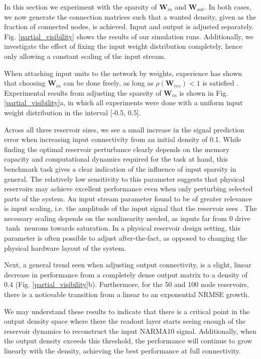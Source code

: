 In this section we experiment with the sparsity of $\mathbf{W}_{in}$ and
$\mathbf{W}_{out}$. In both cases, we now generate the connection matrices such
that a wanted density, given as the fraction of connected nodes, is
achieved. Input and output is adjusted separately. Fig. \ref{partial_visibility}
shows the results of our simulation runs. Additionally, we investigate the
effect of fixing the input weight distribution completely, hence only allowing a
constant scaling of the input stream.

When attaching input units to the network by weights, experience has shown that
choosing $\mathbf{W}_{in}$ can be done freely, as long as
$\rho(\mathbf{W}_{res}) < 1$ is satisfied \cite{jaeger_echo_2001}. Experimental
results from adjusting the sparsity of $\mathbf{W}_{in}$ is shown in
Fig. \ref{partial_visibility}a, in which all experiments were done with a
uniform input weight distribution in the interval [-0.5, 0.5].

Across all three reservoir sizes, we see a small increase in the signal
prediction error when increasing input connectivity from an initial density of
0.1. While finding the optimal reservoir perturbance clearly depends on the
memory capacity and computational dynamics required for the task at hand, this
benchmark task gives a clear indication of the influence of input sparsity in
general. The relatively low sensitivity to this parameter suggests that physical
reservoirs may achieve excellent performance even when only perturbing selected
parts of the system. An input stream parameter found to be of greater relevance
is input scaling, i.e. the amplitude of the input signal that the reservoir sees
\cite{alippi_quantification_2009}. The necessary scaling depends on the
nonlinearity needed, as inputs far from 0 drive $\tanh$ neurons towards
saturation. In a physical reservoir design setting, this parameter is often
possible to adjust after-the-fact, as opposed to changing the physical hardware
layout of the system.

Next, a general trend seen when adjusting output connectivity, is a slight,
linear decrease in performance from a completely dense output matrix to a
density of 0.4 (Fig. \ref{partial_visibility}b). Furthermore, for the 50 and 100
node reservoirs, there is a noticeable transition from a linear to an
exponential NRMSE growth.

We may understand these results to indicate that there is a critical point in
the output density space where there the readout layer starts seeing enough of
the reservoir dynamics to reconstruct the input NARMA10 signal. Additionally,
when the output density exceeds this threshold, the performance will continue to
grow linearly with the density, achieving the best performance at full
connectivity.


